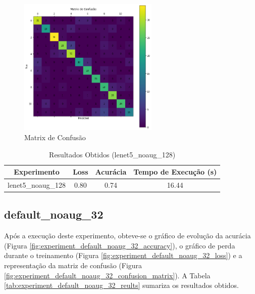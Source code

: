 \documentclass[12pt]{article}
\begin{document}
\begin{figure}[!htb]
  \centering
  \includegraphics[width=18em]{experiments/lenet5_noaug_128/confusion_matrix.png}
  \caption{Matrix de Confusão}
  \label{fig:experiment_lenet5_noaug_128_confusion_matrix}
\end{figure}

\begin{table}[!htb]
  \centering
  \begin{tabular}{|c|c|c|c|}
    \hline
    \textbf{Experimento} & \textbf{Loss} & \textbf{Acurácia} & \textbf{Tempo de Execução (s)} \\ \hline
    lenet5\_noaug\_128   & 0.80          & 0.74              & 16.44                          \\ \hline
  \end{tabular}
  \caption{Resultados Obtidos (lenet5\_noaug\_128)}
  \label{tab:experiment_lenet5_noaug_128_reults}
\end{table}

\newpage

\subsection{default\_noaug\_32}

Após a execução deste experimento, obteve-se o gráfico de evolução da acurácia (Figura \ref{fig:experiment_default_noaug_32_accuracy}), o gráfico de perda durante o treinamento (Figura \ref{fig:experiment_default_noaug_32_loss}) e a representação da matriz de confusão (Figura \ref{fig:experiment_default_noaug_32_confusion_matrix}). A Tabela \ref{tab:experiment_default_noaug_32_reults} sumariza os resultados obtidos.
\end{document}
